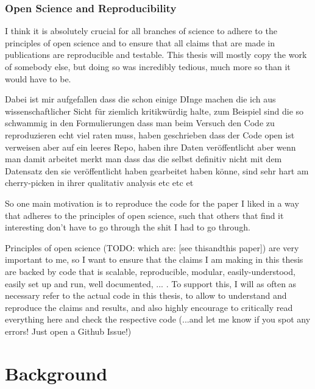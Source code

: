 \documentclass[11pt,
  paper=a4, 
  twoside,  %
  hidelinks,
  bibliography=totocnumbered,
	captions=tableheading,
	BCOR=10mm
]{scrreprt}
\theoremstyle{definition}
\begin{document}
\subsection{Open Science and Reproducibility}

I think it is absolutely crucial for all branches of science to adhere to the principles of open science and to ensure that all claims that are made in publications are reproducible and testable. This thesis will mostly copy the work of somebody else, but doing so was incredibly tedious, much more so than it would have to be.

Dabei ist mir aufgefallen dass die schon einige DInge machen die ich aus wissenschaftlicher Sicht für ziemlich kritikwürdig halte, zum Beispiel sind die so schwammig in den Formulierungen dass man beim Versuch den Code zu reproduzieren echt viel raten muss, haben geschrieben dass der Code open ist verweisen aber auf ein leeres Repo, haben ihre Daten veröffentlicht aber wenn man damit arbeitet merkt man dass das die selbst definitiv nicht mit dem Datensatz den sie veröffentlicht haben gearbeitet haben könne, sind sehr hart am cherry-picken in ihrer qualitativ  analysis etc etc et

So one main motivation is to reproduce the code for the paper I liked in a way that adheres to the principles of open science, such that others that find it interesting don't have to go through the shit I had to go through.

Principles of open science (TODO: which are: [see thisandthis paper]) are very important to me, so I want to ensure that the claims I am making in this thesis are backed by code that is scalable, reproducible, modular, easily-understood, easily set up and run, well documented, ... . To support this, I will as often as necessary refer to the actual code in this thesis, to allow to understand and reproduce the claims and results, and also highly encourage to critically read everything here and check the respective code (...and let me know if you spot any errors! Just open a Github Issue!)



\chapter{Background}
\end{document}
